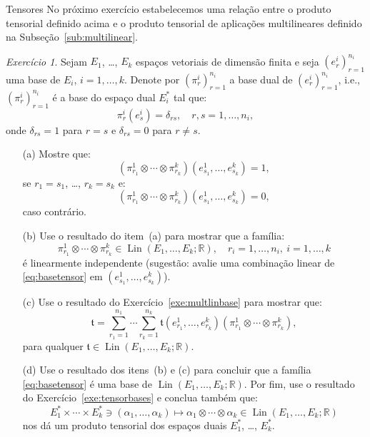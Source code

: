 \documentclass[oneside,11pt]{amsart}
\newcommand{\R}{\mathds R}
\DeclareMathOperator{\Lin}{Lin}
\theoremstyle{remark}\newtheorem{exercise}{Exercício}[section]
\theoremstyle{plain}\newtheorem{teo}{Teorema}[section]
\theoremstyle{plain}\newtheorem{lem}[teo]{Lema}
\theoremstyle{plain}\newtheorem{prop}[teo]{Proposição}
\theoremstyle{definition}\newtheorem{defin}[teo]{Definição}
\theoremstyle{remark}\newtheorem{rem}[teo]{Observação}
\theoremstyle{definition}\newtheorem{example}[teo]{Exemplo}
\numberwithin{equation}{section}
\begin{document}
\begin{section}{Tensores}
No próximo exercício estabelecemos uma relação entre o produto tensorial definido acima e o produto tensorial de aplicações multilineares definido na
Subseção~\ref{sub:multilinear}.
\begin{exercise}\label{exe:Lintensor}
Sejam $E_1$, \dots, $E_k$ espaços vetoriais de dimensão finita e seja $(e^i_r)_{r=1}^{n_i}$ uma base de $E_i$, $i=1,\ldots,k$.
Denote por $(\pi^i_r)_{r=1}^{n_i}$ a base dual de $(e^i_r)_{r=1}^{n_i}$, i.e., $(\pi^i_r)_{r=1}^{n_i}$ é a base do espaço dual $E_i^*$ tal que:
\[\pi^i_r(e^i_s)=\delta_{rs},\quad r,s=1,\ldots,n_i,\]
onde $\delta_{rs}=1$ para $r=s$ e $\delta_{rs}=0$ para $r\ne s$.
\begin{itemize}
\item[(a)] Mostre que:
\[(\pi^1_{r_1}\otimes\cdots\otimes\pi^k_{r_k})(e^1_{s_1},\ldots,e^k_{s_k})=1,\]
se $r_1=s_1$, \dots, $r_k=s_k$ e:
\[(\pi^1_{r_1}\otimes\cdots\otimes\pi^k_{r_k})(e^1_{s_1},\ldots,e^k_{s_k})=0,\]
caso contrário.
\item[(b)] Use o resultado do item~(a) para mostrar que a família:
\begin{equation}\label{eq:basetensor}
\pi^1_{r_1}\otimes\cdots\otimes\pi^k_{r_k}\in\Lin(E_1,\ldots,E_k;\R),\quad r_i=1,\ldots,n_i,\ i=1,\ldots,k
\end{equation}
é linearmente independente (sugestão: avalie uma combinação linear de \eqref{eq:basetensor} em $(e^1_{s_1},\ldots,e^k_{s_k})$).
\item[(c)] Use o resultado do Exercício~\ref{exe:multlinbase} para mostrar que:
\[\mathfrak t=\sum_{r_1=1}^{n_1}\cdots\sum_{r_k=1}^{n_k}\mathfrak t(e^1_{r_1},\ldots,e^k_{r_k})(\pi^1_{r_1}\otimes\cdots\otimes\pi^k_{r_k}),\]
para qualquer $\mathfrak t\in\Lin(E_1,\ldots,E_k;\R)$.
\item[(d)] Use o resultado dos itens~(b) e (c) para concluir que a família \eqref{eq:basetensor} é uma base de $\Lin(E_1,\ldots,E_k;\R)$. Por fim, use o resultado
do Exercício~\ref{exe:tensorbases} e conclua também que:
\[E_1^*\times\cdots\times E_k^*\ni(\alpha_1,\ldots,\alpha_k)\longmapsto\alpha_1\otimes\cdots\otimes\alpha_k\in\Lin(E_1,\ldots,E_k;\R)\]
nos dá um produto tensorial dos espaços duais $E_1^*$, \dots, $E_k^*$.
\end{itemize}
\end{exercise}


\end{section}
\end{document}
